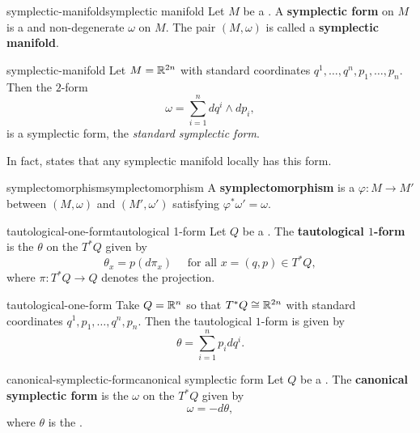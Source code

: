 \begin{topic}{symplectic-manifold}{symplectic manifold}
    Let $M$ be a . A \textbf{symplectic form} on $M$ is a  and non-degenerate  $\omega$ on $M$. The pair $(M, \omega)$ is called a \textbf{symplectic manifold}.
\end{topic}

\begin{example}{symplectic-manifold}
    Let $M = \mathbb{R}^{2n}$ with standard coordinates $q^1, \ldots, q^n, p_1, \ldots, p_n$. Then the $2$-form
    \[ \omega = \sum_{i = 1}^{n} d q^i \wedge d p_i , \]
    is a symplectic form, the \textit{standard symplectic form}.
    
    In fact,  states that any symplectic manifold locally has this form.
\end{example}

\begin{topic}{symplectomorphism}{symplectomorphism}
    A \textbf{symplectomorphism} is a  $\varphi \colon M \to M'$ between  $(M, \omega)$ and $(M', \omega')$ satisfying $\varphi^* \omega' = \omega$.
\end{topic}

\begin{topic}{tautological-one-form}{tautological 1-form}
    Let $Q$ be a . The \textbf{tautological $1$-form} is the  $\theta$ on the  $T^*Q$ given by
    \[ \theta_x = p(d \pi_x) \quad \text{ for all } x = (q, p) \in T^*Q , \]
    where $\pi \colon T^*Q \to Q$ denotes the projection.
\end{topic}

\begin{example}{tautological-one-form}
    Take $Q = \mathbb{R}^n$ so that $T^* Q \cong \mathbb{R}^{2n}$ with standard coordinates $q^1, p_1, \ldots, q^n, p_n$. Then the tautological $1$-form is given by
    \[ \theta = \sum_{i = 1}^{n} p_i dq^i . \]
\end{example}

\begin{topic}{canonical-symplectic-form}{canonical symplectic form}
    Let $Q$ be a . The \textbf{canonical symplectic form} is the  $\omega$ on the  $T^* Q$ given by
    \[ \omega = -d \theta , \]
    where $\theta$ is the .
\end{topic}

